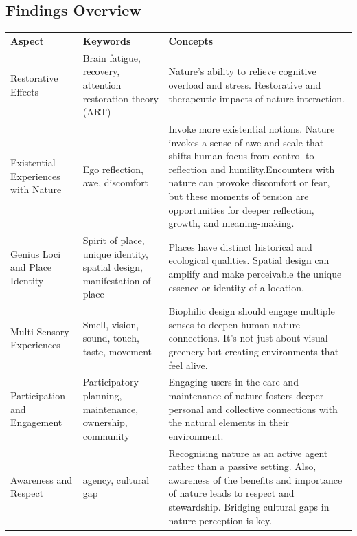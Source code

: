 \subsection{Findings Overview}
\label{appendix-findings-table}
\begin{longtable}{|p{3cm}|p{3.5cm}|p{7.5cm}|}
\hline
\rowcolor[HTML]{B3E5FC} 
\multicolumn{3}{|c|}{\cellcolor[HTML]{E1F5FE}\textbf{I - Deeper Connection}} \\ \hline
\textbf{Aspect} & \textbf{Keywords} & \textbf{Concepts} \\
\hline
Restorative Effects & Brain fatigue, recovery, attention restoration theory (ART) & Nature’s ability to relieve cognitive overload and stress. Restorative and therapeutic impacts of nature interaction.  \\ \hline

Existential Experiences with Nature & Ego reflection, awe, discomfort & Invoke more existential notions. Nature invokes a sense of awe and scale that shifts human focus from control to reflection and humility.Encounters with nature can provoke discomfort or fear, but these moments of tension are opportunities for deeper reflection, growth, and meaning-making.
\\ \hline

Genius Loci and Place Identity & Spirit of place, unique identity, spatial design, manifestation of place & Places have distinct historical and ecological qualities. Spatial design can amplify and make perceivable the unique essence or identity of a location. \\ \hline

Multi-Sensory Experiences & Smell, vision, sound, touch, taste, movement & Biophilic design should engage multiple senses to deepen human-nature connections. It’s not just about visual greenery but creating environments that feel alive. \\ \hline


Participation and Engagement & Participatory planning, maintenance, ownership, community & Engaging users in the care and maintenance of nature fosters deeper personal and collective connections with the natural elements in their environment. \\ \hline

Awareness and Respect & agency, cultural gap & Recognising nature as an active agent rather than a passive setting. Also, awareness of the benefits and importance of nature leads to respect and stewardship. Bridging cultural gaps in nature perception is key. \\ \hline


\end{longtable}
